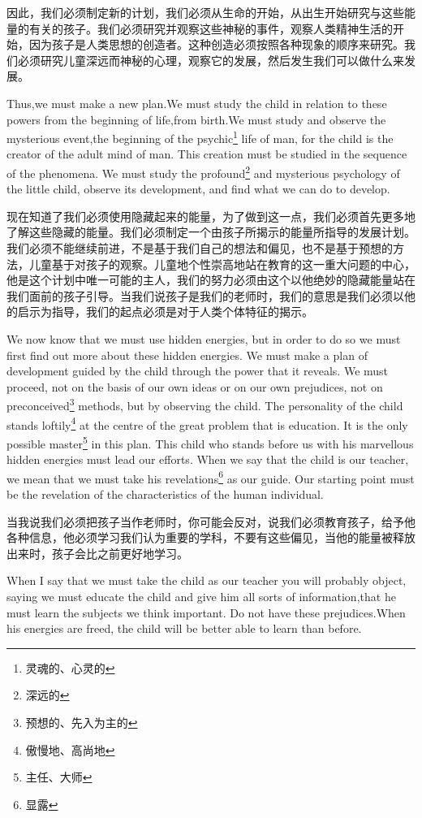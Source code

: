 \documentclass[lang=cn,10pt]{elegantbook}
\begin{document}
因此，我们必须制定新的计划，我们必须从生命的开始，从出生开始研究与这些能量的有关的孩子。我们必须研究并观察这些神秘的事件，观察人类精神生活的开始，因为孩子是人类思想的创造者。这种创造必须按照各种现象的顺序来研究。我们必须研究儿童深远而神秘的心理，观察它的发展，然后发生我们可以做什么来发展。

Thus,we must make a new plan.We must study the child in relation to these powers from the beginning of life,from birth.We must study and observe the mysterious event,the beginning of the psychic\footnote{灵魂的、心灵的} life of man, for the child is the creator of the adult mind of man. This creation must be studied in the sequence of the phenomena. We must study the profound\footnote{深远的} and mysterious psychology of the little child, observe its development, and find what we can do to develop.

现在知道了我们必须使用隐藏起来的能量，为了做到这一点，我们必须首先更多地了解这些隐藏的能量。我们必须制定一个由孩子所揭示的能量所指导的发展计划。我们必须不能继续前进，不是基于我们自己的想法和偏见，也不是基于预想的方法，儿童基于对孩子的观察。儿童地个性崇高地站在教育的这一重大问题的中心，他是这个计划中唯一可能的主人，我们的努力必须由这个以他绝妙的隐藏能量站在我们面前的孩子引导。当我们说孩子是我们的老师时，我们的意思是我们必须以他的启示为指导，我们的起点必须是对于人类个体特征的揭示。

We now know that we must use hidden energies, but in order to do so we must first find out more about these hidden energies. We must make a plan of development guided by the child through the power that it reveals. We must proceed, not on the basis of our own ideas or on our own prejudices, not on preconceived\footnote{预想的、先入为主的} methods, but by observing the child. The personality of the child stands loftily\footnote{傲慢地、高尚地} at the centre of the great problem that is education. It is the only possible master\footnote{主任、大师} in this plan. This child who stands before us with his marvellous hidden energies must lead our efforts. When we say that the child is our teacher, we mean that we must take his revelations\footnote{显露} as our guide. Our starting point must be the revelation of the characteristics of the human individual.

当我说我们必须把孩子当作老师时，你可能会反对，说我们必须教育孩子，给予他各种信息，他必须学习我们认为重要的学科，不要有这些偏见，当他的能量被释放出来时，孩子会比之前更好地学习。

When I say that we must take the child as our teacher you will probably object, saying we must educate the child and give him all sorts of information,that he must learn the subjects we think important. Do not have these prejudices.When his energies are freed, the child will be better able to learn than before.
\end{document}
